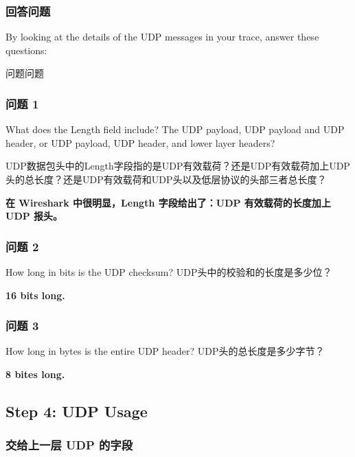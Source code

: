 \documentclass[14pt,a4paper,UTF8,twoside]{article}
\begin{document}
\subsubsection{回答问题}

By looking at the details of the UDP messages in your trace, answer these questions:

\begin{ans}{问题}{问题}
\subsubsection*{问题 1}

What does the Length field include? The UDP payload, UDP payload and UDP header, or UDP payload, UDP header, and lower layer headers?

UDP数据包头中的Length字段指的是UDP有效载荷？还是UDP有效载荷加上UDP头的总长度？还是UDP有效载荷和UDP头以及低层协议的头部三者总长度？

\textbf{在 Wireshark 中很明显，Length 字段给出了：UDP 有效载荷的长度加上 UDP 报头。}

\vspace{0.5cm}

\subsubsection*{问题 2}

How long in bits is the UDP checksum? UDP头中的校验和的长度是多少位？

\textbf{16 bits long.}

\vspace{0.5cm}

\subsubsection*{问题 3}

How long in bytes is the entire UDP header? UDP头的总长度是多少字节？

\textbf{8 bites long.}
\end{ans}

\subsection{Step 4: UDP Usage}

\subsubsection{交给上一层 UDP 的字段}
\end{document}
